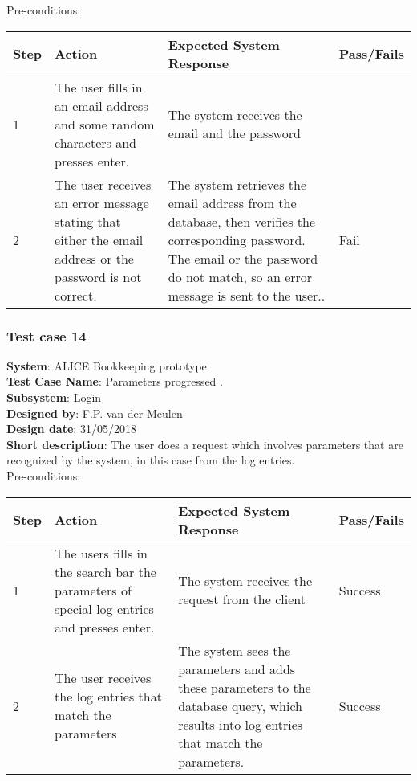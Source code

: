 Pre-conditions: \\

\begin{longtable}{ | p{0.8cm} | p{4.5cm} | p{6cm} | p{1.5cm} |}
\hline
Step & Action & Expected System Response & Pass/Fails  \\ \hline
1 & The user fills in an email address and some random characters and presses enter. & The system receives the email and the password &  \\ \hline
2 & The user receives an error message stating that either the email address or the password is not correct. & The system retrieves the email address from the database, then verifies the corresponding password. The email or the password do not match, so an error message is sent to the user.. & Fail \\ \hline
\end{longtable}
\newpage
\subsubsection{Test case 14}
\textbf{System}:  ALICE Bookkeeping prototype \\
\textbf{Test Case Name}:  Parameters progressed . \\
\textbf{Subsystem}:  Login \\
\textbf{Designed by}:  F.P. van der Meulen\\
\textbf{Design date}:  31/05/2018\\
\textbf{Short description}: The user does a request which involves parameters that are recognized by the system, in this case from the log entries. \\

Pre-conditions: \\

\begin{longtable}{ | p{0.8cm} | p{4.5cm} | p{6cm} | p{1.5cm} |}
\hline
Step & Action & Expected System Response & Pass/Fails  \\ \hline
1 & The users fills in the search bar the parameters of special log entries and presses enter. & The system receives the request from the client & Success \\ \hline
2 & The user receives the log entries that match the parameters & The system sees the parameters and adds these parameters to the database query, which results into log entries that match the parameters. & Success \\ \hline
\end{longtable}

